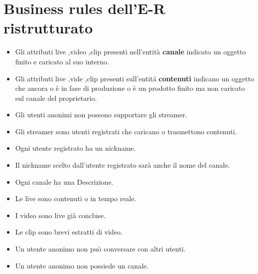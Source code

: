 \section{Business rules dell'E-R ristrutturato }
\begin{itemize}
    \item Gli attributi live ,video ,clip presenti nell'entità \textbf{canale} indicato un oggetto finito e caricato al suo interno.
    \item Gli attributi live ,vide ,clip presenti sull'entitá \textbf{contenuti} indicano un oggetto che ancora o è in fase di produzione o è un prodotto finito ma non caricato sul canale del proprietario. 
    \item Gli utenti anonimi non possono supportare gli streamer. 
    \item Gli streamer sono utenti registrati che caricano  o trasmettono contenuti. 
    \item Ogni utente registrato ha un nickname. 
    \item Il nickname scelto dall'utente registrato sarà anche il nome del canale. 
    \item Ogni canale ha una Descrizione. 
    \item Le live sono contenuti o in tempo reale.
    \item I video sono live già concluse. 
    \item Le clip sono brevi estratti di video. 
    \item Un utente anonimo non può conversare con altri utenti.
    \item Un utente anonimo non possiede un canale. 
\end{itemize}
